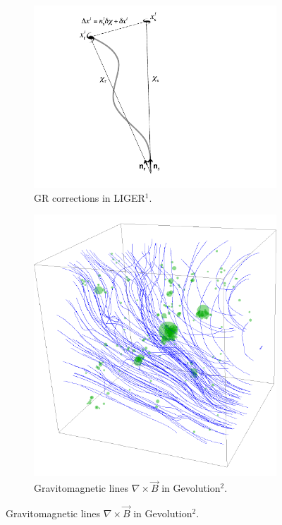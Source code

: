 \documentclass{beamer}
\makeatletter
\newcommand{\mylabel}{%
   [\beamer@againname]}
\makeatother
\begin{document}
\begin{frame}[label=ligergevolution]
    \frametitle{\insertsection\mylabel}
    \begin{figure}
        \centering
        \begin{subfigure}{0.49\textwidth}
        \includegraphics[width=\textwidth,height=.6\textheight]{images/liger-correction.pdf}
        \caption{GR corrections in LIGER$^1$.}
        \end{subfigure}
        \begin{subfigure}{.49\textwidth}
        \includegraphics[width=\textwidth,height=.6\textheight]{images/gevolution-vector-potential.pdf}
        \caption{Gravitomagnetic lines $\nabla\times \vec B$ in
        Gevolution$^2$.}
        \end{subfigure}
    \end{figure}
\end{frame}
\end{document}
